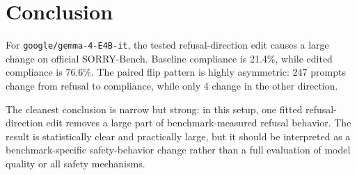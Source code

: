 \section{Conclusion}

For \texttt{google/gemma-4-E4B-it}, the tested refusal-direction edit causes a
large change on official SORRY-Bench. Baseline compliance is 21.4\%, while
edited compliance is 76.6\%. The paired flip pattern is highly asymmetric:
247 prompts change from refusal to compliance, while only 4 change in the other
direction.

The cleanest conclusion is narrow but strong: in this setup, one fitted
refusal-direction edit removes a large part of benchmark-measured refusal
behavior. The result is statistically clear and practically large, but it should
be interpreted as a benchmark-specific safety-behavior change rather than a full
evaluation of model quality or all safety mechanisms.
